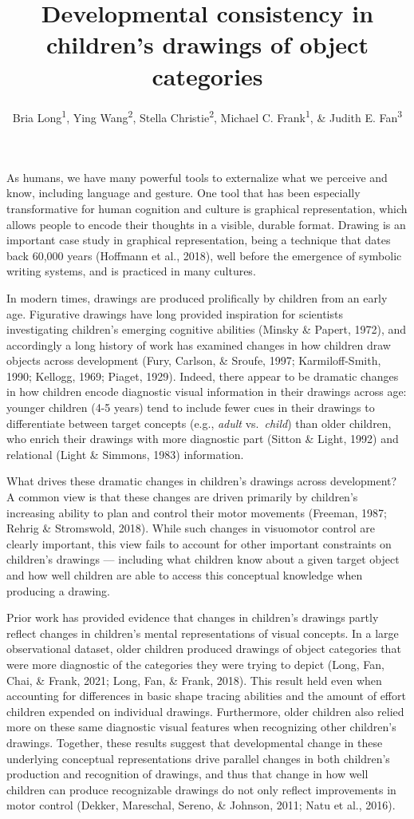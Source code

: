\documentclass[
  english,
  man]{apa6}
\author{Bria Long\textsuperscript{1}, Ying Wang\textsuperscript{2}, Stella Christie\textsuperscript{2}, Michael C. Frank\textsuperscript{1}, \& Judith E. Fan\textsuperscript{3}}
\affiliation{
\vspace{0.5cm}
\textsuperscript{1} Stanford University\\\textsuperscript{2} Tsinghua University\\\textsuperscript{3} University of California, San Diego}
\title{Developmental consistency in children's drawings of object categories}
\date{}
\begin{document}
\maketitle

As humans, we have many powerful tools to externalize what we perceive and know, including language and gesture.
One tool that has been especially transformative for human cognition and culture is graphical representation, which allows people to encode their thoughts in a visible, durable format.
Drawing is an important case study in graphical representation, being a technique that dates back 60,000 years (Hoffmann et al., 2018), well before the emergence of symbolic writing systems, and is practiced in many cultures.

In modern times, drawings are produced prolifically by children from an early age.
Figurative drawings have long provided inspiration for scientists investigating children's emerging cognitive abilities (Minsky \& Papert, 1972), and accordingly a long history of work has examined changes in how children draw objects across development (Fury, Carlson, \& Sroufe, 1997; Karmiloff-Smith, 1990; Kellogg, 1969; Piaget, 1929).
Indeed, there appear to be dramatic changes in how children encode diagnostic visual information in their drawings across age: younger children (4-5 years) tend to include fewer cues in their drawings to differentiate between target concepts (e.g., \textit{adult} vs.~\textit{child}) than older children, who enrich their drawings with more diagnostic part (Sitton \& Light, 1992) and relational (Light \& Simmons, 1983) information.

What drives these dramatic changes in children's drawings across development?
A common view is that these changes are driven primarily by children's increasing ability to plan and control their motor movements (Freeman, 1987; Rehrig \& Stromswold, 2018).
While such changes in visuomotor control are clearly important, this view fails to account for other important constraints on children's drawings --- including what children know about a given target object and how well children are able to access this conceptual knowledge when producing a drawing.

Prior work has provided evidence that changes in children's drawings partly reflect changes in children's mental representations of visual concepts. In a large observational dataset, older children produced drawings of object categories that were more diagnostic of the categories they were trying to depict (Long, Fan, Chai, \& Frank, 2021; Long, Fan, \& Frank, 2018). This result held even when accounting for differences in basic shape tracing abilities and the amount of effort children expended on individual drawings. Furthermore, older children also relied more on these same diagnostic visual features when recognizing other children's drawings.
Together, these results suggest that developmental change in these underlying conceptual representations drive parallel changes in both children's production and recognition of drawings, and thus that change in how well children can produce recognizable drawings do not only reflect improvements in motor control (Dekker, Mareschal, Sereno, \& Johnson, 2011; Natu et al., 2016).
\end{document}
